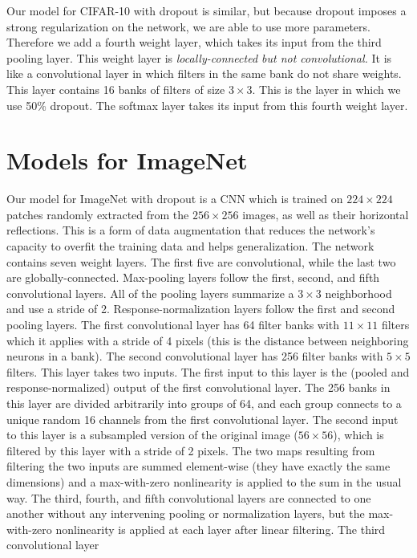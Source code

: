 \documentclass[12pt]{article}
\begin{document}
Our model for CIFAR-10 with dropout is similar, but because dropout
imposes a strong regularization on the network, we are able to use
more parameters. Therefore we add a fourth weight layer, which takes
its input from the third pooling layer. This weight layer is \emph{locally-connected
but not convolutional.} It is like a convolutional layer in which
filters in the same bank do not share weights. This layer contains
16 banks of filters of size $3\times3$. This is the layer in which
we use 50\% dropout. The softmax layer takes its input from this fourth
weight layer.


\section{Models for ImageNet}

Our model for ImageNet with dropout is a CNN which is trained on $224\times224$
patches randomly extracted from the $256\times256$ images, as well
as their horizontal reflections. This is a form of data augmentation
that reduces the network's capacity to overfit the training data and
helps generalization. The network contains seven weight layers. The
first five are convolutional, while the last two are globally-connected.
Max-pooling layers follow the first, second, and fifth convolutional
layers. All of the pooling layers summarize a $3\times3$ neighborhood
and use a stride of 2. Response-normalization layers follow the first
and second pooling layers. The first convolutional layer has 64 filter
banks with $11\times11$ filters which it applies with a stride of
4 pixels (this is the distance between neighboring neurons in a bank).
The second convolutional layer has 256 filter banks with $5\times5$
filters. This layer takes two inputs. The first input to this layer
is the (pooled and response-normalized) output of the first convolutional
layer. The 256 banks in this layer are divided arbitrarily into groups
of 64, and each group connects to a unique random 16 channels from
the first convolutional layer. The second input to this layer is a
subsampled version of the original image ($56\times56$), which is
filtered by this layer with a stride of 2 pixels. The two maps resulting
from filtering the two inputs are summed element-wise (they have exactly
the same dimensions) and a max-with-zero nonlinearity is applied to
the sum in the usual way. The third, fourth, and fifth convolutional
layers are connected to one another without any intervening pooling
or normalization layers, but the max-with-zero nonlinearity is applied
at each layer after linear filtering. The third convolutional layer
\end{document}
